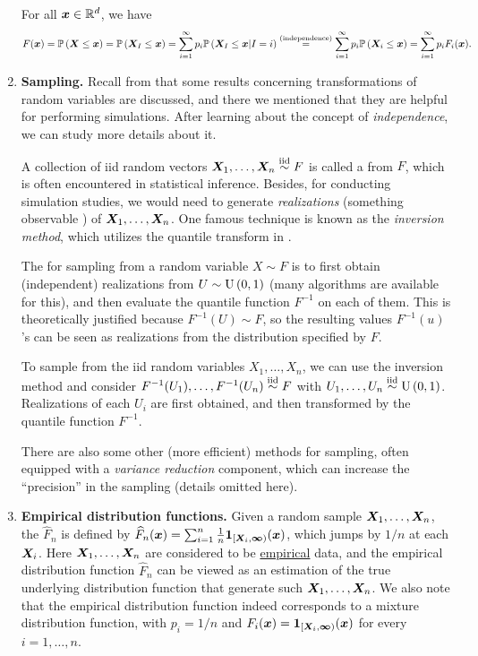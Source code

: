 \begin{enumerate}
\begin{pf}
For all \(\bm{x}\in\mathbb{R}^d\), we have
\[
F(\bm{x})=\mathbb{P}\left(\bm{X}\le\bm{x}\right)
=\mathbb{P}\left(\bm{X}_{I}\le\bm{x}\right)
=\sum_{i=1}^{\infty}p_i\mathbb{P}\left(\bm{X}_{I}\le\bm{x}|I=i\right)
\overset{\text{(independence)}}{=}\sum_{i=1}^{\infty}p_i\mathbb{P}\left(\bm{X}_i\le\bm{x}\right)
=\sum_{i=1}^{\infty}p_iF_i(\bm{x}).
\]
\end{pf}
\item \label{it:sampling} \textbf{Sampling.} Recall from
 that some results concerning transformations of
random variables are discussed, and there we mentioned that they are helpful
for performing simulations. After learning about the concept of
\emph{independence}, we can study more details about it.

A collection of iid random vectors \(\bm{X}_1,\dotsc,\bm{X}_n\overset{\text{iid}}\sim F\) is called a
 from \(F\), which is often encountered in statistical
inference. Besides, for conducting simulation studies, we would need to
generate \emph{realizations} (something observable ) of
\(\bm{X}_1,\dotsc,\bm{X}_n\). One famous technique is known as the \emph{inversion
method}, which utilizes the quantile transform in .

The  for sampling from a random variable \(X\sim F\) is
to first obtain (independent) realizations from \(U\sim \operatorname{U}\left(0,1\right)\) (many
algorithms are available for this), and then evaluate the quantile function
\(F^{-1}\) on each of them. This is theoretically justified because \(F^{-1}(U)\sim F\), 
so the resulting values \(F^{-1}(u)\)'s can be seen as realizations from the
distribution specified by \(F\).

To sample from the iid random variables \(X_1,\dotsc,X_n\), we can use the
inversion method and consider \(F^{-1}(U_1),\dotsc,F^{-1}(U_n)\overset{\text{iid}}\sim F\) with
\(U_1,\dotsc,U_n\overset{\text{iid}}\sim \operatorname{U}\left(0,1\right)\). Realizations of each \(U_i\) are first
obtained, and then transformed by the quantile function \(F^{-1}\).

\begin{note}
There are also some other (more efficient) methods for sampling, often equipped
with a \emph{variance reduction} component, which can increase the ``precision'' in
the sampling (details omitted here).
\end{note}
\item \textbf{Empirical distribution functions.} Given a random sample
\(\bm{X}_1,\dotsc,\bm{X}_n\), the  \(\widehat{F}_n\) is defined by
\(\widehat{F}_n(\bm{x})=\sum_{i=1}^{n}\frac{1}{n}\mathbf{1}_{[\bm{X}_i,\bm{\infty})}(\bm{x})\),
which jumps by \(1/n\) at each \(\bm{X}_i\). Here
\(\bm{X}_1,\dotsc,\bm{X}_n\) are considered to be \underline{empirical} data,
and the empirical distribution function \(\widehat{F}_n\) can be viewed as an
estimation of the true underlying distribution function that generate such
\(\bm{X}_1,\dotsc,\bm{X}_n\). We also note that the empirical distribution
function indeed corresponds to a mixture distribution function, with
\(p_i=1/n\) and \(F_i(\bm{x})=\mathbf{1}_{[\bm{X}_i,\bm{\infty})}(\bm{x})\)
for every \(i=1,\dotsc,n\).


\end{enumerate}
